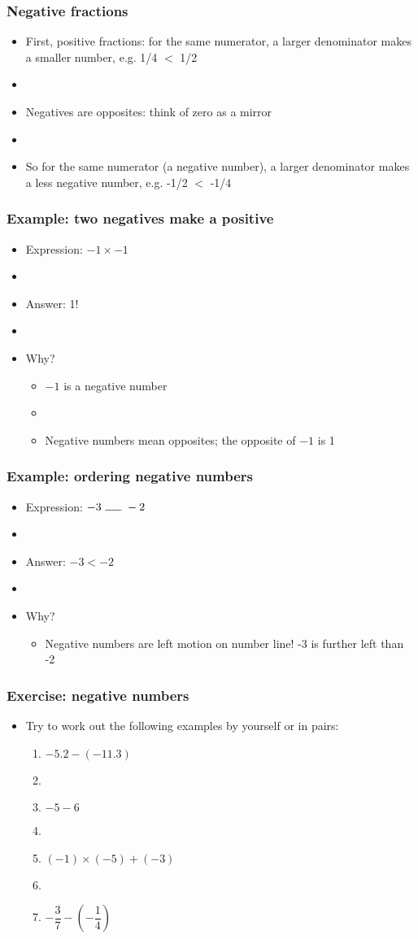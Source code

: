 \documentclass[11pt]{beamer}
\newcommand{\myframe}[1]{\begin{frame} \frametitle{#1}}
\begin{document}
\myframe{Negative fractions}
\begin{itemize}
\item First, positive fractions: for the same numerator, a larger denominator makes a smaller number, e.g. 1/4 $<$ 1/2
\item[]
\item Negatives are opposites: think of zero as a mirror
\item[]
\item So for the same numerator (a negative number), a larger denominator makes a less negative number, e.g. -1/2 $<$ -1/4
\end{itemize}
\end{frame}

\myframe{Example: two negatives make a positive}
\begin{itemize}
\item Expression: $-1 \times -1$
\item[]
\item Answer: 1!
\item[]
\item Why?
\begin{itemize}
\item $-1$ is a negative number
\item[]
\item Negative numbers mean opposites; the opposite of $-1$ is 1
\end{itemize}
\end{itemize}
\end{frame}

\myframe{Example: ordering negative numbers}
\begin{itemize}
\item Expression: $-3 \ \rule{.5cm}{0.15mm} \ -2$
\item[]
\item Answer: $-3 < -2$
\item[]
\item Why?
\begin{itemize}
\item Negative numbers are left motion on number line! -3 is further left than -2
\end{itemize}
\end{itemize}
\end{frame}

\myframe{Exercise: negative numbers}
\begin{itemize}
\item Try to work out the following examples by yourself or in pairs:
\begin{enumerate}
\item $-5.2 - (-11.3)$
\item[]
\item $-5 - 6$
\item[]
\item $(-1)\times(-5) + (-3)$
\item[]
\item $-\dfrac{3}{7} - \left(-\dfrac{1}{4}\right)$
\end{enumerate}
\end{itemize}
\end{frame}
\end{document}
